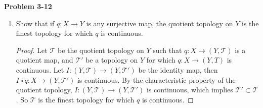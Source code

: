 \documentclass[12pt, a4paper]{article}
\theoremstyle{plain}
\newcommand{\T}{\mathcal{T}}
\newenvironment{problem}[2][Problem]
    { \begin{mdframed}[backgroundcolor=gray!20] \textbf{#1 #2} \\}
    {  \end{mdframed}}
\begin{document}
\begin{problem}{3-12}
\begin{enumerate}[label=(\alph*)]
\item Show that if $q:X\rightarrow Y$ is any surjective map, the quotient topology on $Y$ is the finest topology for which $q$ is continuous.
	\begin{proof}
	Let $\T$ be the quotient topology on $Y$ such that $q:X\rightarrow (Y,\T)$ is a quotient map, and $\T'$ be a topology on $Y$ for which $q:X\rightarrow (Y,T)$ is continuous. Let $I:(Y,\T)\rightarrow (Y,\T')$ be the identity map, then $I\circ q: X\rightarrow (Y,\T')$ is continuous. By the characteristic property of the quotient topology, $I:(Y,\T)\rightarrow (Y,\T')$ is continuous, which implies $\T'\subset \T$. So $\T$ is the finest topology for which $q$ is continuous.
	\end{proof}
\end{enumerate}
\end{problem}
\pagebreak
\end{document}
